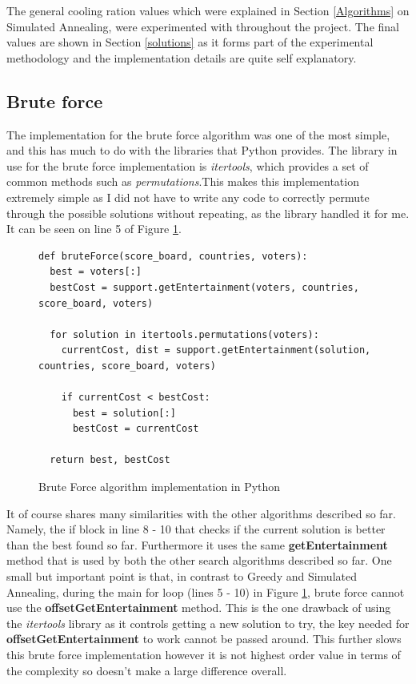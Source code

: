 \documentclass[12pt]{report}
\begin{document}
The general cooling ration values which were explained in Section \ref{Algorithms} on Simulated Annealing, were experimented with throughout the project. The final values are shown in Section \ref{solutions} as it forms part of the experimental methodology and the implementation details are quite self explanatory.

\subsection{Brute force}\label{Imp-Brute}
The implementation for the brute force algorithm was one of the most simple, and this has much to do with the libraries that Python provides. The library in use for the brute force implementation is \textit{itertools}\cite{PythonItertools}, which provides a set of common methods such as \textit{permutations}\cite{PythonPermutations}.This makes this implementation extremely simple as I did not have to write any code to correctly permute through the possible solutions without repeating, as the library handled it for me. It can be seen on line 5 of Figure \ref{bruteForce}.

\begin{figure}[H]
\caption{Brute Force algorithm implementation in Python}
\label{bruteForce}
\begin{lstlisting}
def bruteForce(score_board, countries, voters):
  best = voters[:]
  bestCost = support.getEntertainment(voters, countries, score_board, voters)

  for solution in itertools.permutations(voters):
    currentCost, dist = support.getEntertainment(solution, countries, score_board, voters)

    if currentCost < bestCost:
      best = solution[:]
      bestCost = currentCost

  return best, bestCost
\end{lstlisting}
\end{figure}

It of course shares many similarities with the other algorithms described so far. Namely, the if block in line 8 - 10 that checks if the current solution is better than the best found so far. Furthermore it uses the same \textbf{getEntertainment} method that is used by both the other search algorithms described so far. One small but important point is that, in contrast to Greedy and Simulated Annealing, during the main for loop (lines 5 - 10) in Figure \ref{bruteForce}, brute force cannot use the \textbf{offsetGetEntertainment} method. This is the one drawback of using the \textit{itertools} library as it controls getting a new solution to try, the key needed for \textbf{offsetGetEntertainment} to work cannot be passed around. This further slows this brute force implementation however it is not highest order value in terms of the  complexity so doesn't make a large difference overall.
\end{document}
